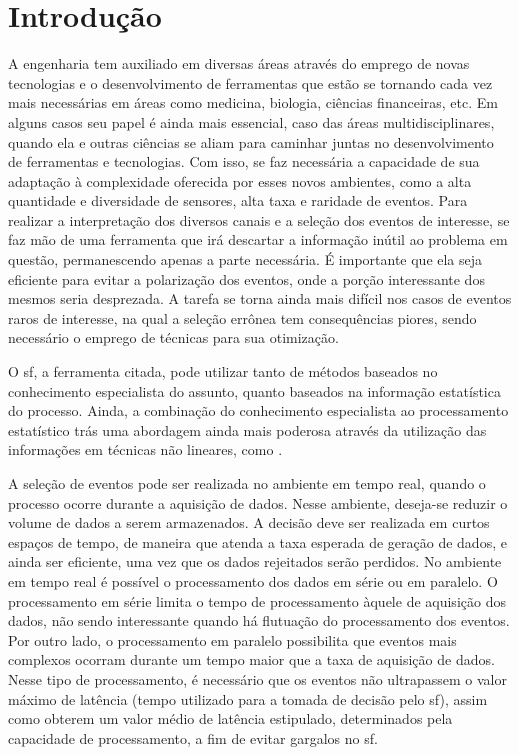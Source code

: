 \chapter{Introdução}
\label{cap:intro}
\glsresetall

A engenharia tem auxiliado em diversas áreas através do emprego de
novas tecnologias e o desenvolvimento de ferramentas que estão se tornando cada
vez mais necessárias em áreas como medicina, biologia, ciências financeiras, etc. Em 
alguns casos seu papel é ainda mais essencial, caso das áreas
multidisciplinares, quando ela e outras ciências se aliam para caminhar juntas no
desenvolvimento de ferramentas e tecnologias. Com isso, se faz necessária a
capacidade de sua adaptação à complexidade oferecida por esses novos ambientes, 
como a alta quantidade e diversidade de sensores, alta taxa e raridade de
eventos. Para realizar a interpretação dos diversos canais e a seleção dos eventos 
de interesse, se faz mão de uma ferramenta que irá descartar a 
informação inútil ao problema em questão, permanescendo apenas
a parte necessária. É importante que ela seja eficiente para evitar a polarização
dos eventos, onde a porção interessante dos mesmos seria desprezada.
A tarefa se torna ainda mais difícil nos casos de 
eventos raros de interesse, na qual a seleção errônea tem consequências piores,
sendo necessário o emprego de técnicas para sua otimização. 

O \glsdesc{sf}, a ferramenta citada, pode utilizar tanto de métodos baseados no conhecimento 
especialista do assunto, quanto baseados na informação estatística do processo. Ainda, 
a combinação do conhecimento especialista ao processamento estatístico trás uma abordagem ainda 
mais poderosa através da utilização das informações em técnicas não lineares, 
como .

A seleção de eventos pode ser realizada no ambiente em tempo real,
quando o processo ocorre durante a aquisição de dados. Nesse
ambiente, deseja-se reduzir o volume de dados a serem armazenados. A decisão deve ser realizada 
em curtos espaços de tempo, de maneira que atenda a taxa esperada de geração de
dados, e ainda ser eficiente, uma vez que os dados rejeitados serão perdidos. 
No ambiente em tempo real é possível o processamento dos dados em série
ou em paralelo. O processamento em série limita o tempo de processamento àquele
de aquisição dos dados, não sendo interessante quando há flutuação do
processamento dos eventos. Por outro lado, o processamento em
paralelo possibilita que eventos mais complexos ocorram durante um tempo maior
que a taxa de aquisição de dados. Nesse tipo de processamento, é necessário que
os eventos não ultrapassem o valor máximo de latência (tempo utilizado
para a tomada de decisão pelo \glsdesc{sf}), assim como obterem um valor 
médio de latência estipulado, determinados pela capacidade de processamento,
a fim de evitar gargalos no \glsdesc{sf}.

